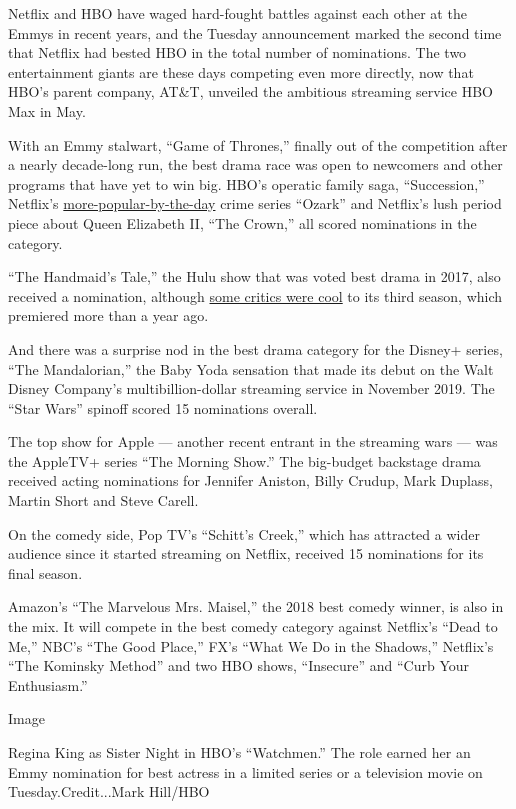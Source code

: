 Netflix and HBO have waged hard-fought battles against each other at the
Emmys in recent years, and the Tuesday announcement marked the second
time that Netflix had bested HBO in the total number of nominations. The
two entertainment giants are these days competing even more directly,
now that HBO's parent company, AT\&T, unveiled the ambitious streaming
service HBO Max in May.

With an Emmy stalwart, ``Game of Thrones,'' finally out of the
competition after a nearly decade-long run, the best drama race was open
to newcomers and other programs that have yet to win big. HBO's operatic
family saga, ``Succession,'' Netflix's
\href{https://deadline.com/2020/04/ozark-season-3-ratings-netflix-1202915140/}{more-popular-by-the-day}
crime series ``Ozark'' and Netflix's lush period piece about Queen
Elizabeth II, ``The Crown,'' all scored nominations in the category.

``The Handmaid's Tale,'' the Hulu show that was voted best drama in
2017, also received a nomination, although
\href{https://www.metacritic.com/tv/the-handmaids-tale/critic-reviews?sort-by=date\&num_items=100}{some
critics were cool} to its third season, which premiered more than a year
ago.

And there was a surprise nod in the best drama category for the Disney+
series, ``The Mandalorian,'' the Baby Yoda sensation that made its debut
on the Walt Disney Company's multibillion-dollar streaming service in
November 2019. The ``Star Wars'' spinoff scored 15 nominations overall.

The top show for Apple --- another recent entrant in the streaming wars
--- was the AppleTV+ series ``The Morning Show.'' The big-budget
backstage drama received acting nominations for Jennifer Aniston, Billy
Crudup, Mark Duplass, Martin Short and Steve Carell.

On the comedy side, Pop TV's ``Schitt's Creek,'' which has attracted a
wider audience since it started streaming on Netflix, received 15
nominations for its final season.

Amazon's ``The Marvelous Mrs. Maisel,'' the 2018 best comedy winner, is
also in the mix. It will compete in the best comedy category against
Netflix's ``Dead to Me,'' NBC's ``The Good Place,'' FX's ``What We Do in
the Shadows,'' Netflix's ``The Kominsky Method'' and two HBO shows,
``Insecure'' and ``Curb Your Enthusiasm.''

Image

Regina King as Sister Night in HBO's ``Watchmen.'' The role earned her
an Emmy nomination for best actress in a limited series or a television
movie on Tuesday.Credit...Mark Hill/HBO

